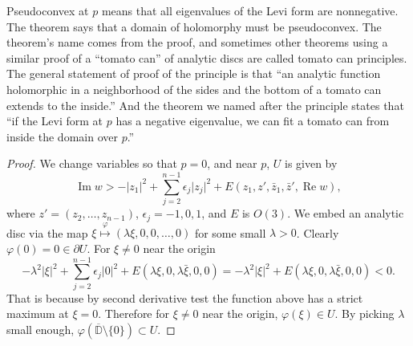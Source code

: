 \documentclass[12pt,openany]{book}
\renewcommand{\Re}{\operatorname{Re}}
\renewcommand{\Im}{\operatorname{Im}}
\newcommand{\sabs}[1]{\lvert {#1} \rvert}
\newcommand{\D}{{\mathbb{D}}}
\theoremstyle{plain}
\theoremstyle{remark}
\theoremstyle{definition}
\theoremstyle{exercise}
\theoremstyle{example}
\begin{document}
Pseudoconvex at $p$ means that all eigenvalues of the Levi form are
nonnegative.
The theorem says that a domain of holomorphy must be pseudoconvex.
The theorem's name comes from the proof, and sometimes other theorems using a
similar proof of a ``tomato can'' of analytic discs are called
tomato can principles.
The general statement of proof of the principle is that ``an
analytic function holomorphic in a neighborhood of the sides and the bottom
of a tomato can extends to the inside.''  And the theorem we named after
the principle states that ``if the Levi form at $p$ has a negative
eigenvalue, we can fit a tomato can from inside the domain over $p$.''

\begin{proof}
We change variables so that $p = 0$, and
near $p$, $U$ is given by
\begin{equation*}
\Im w > -\sabs{z_1}^2 + \sum_{j=2}^{n-1} \epsilon_j \sabs{z_j}^2 +
E(z_1,z',\bar{z}_1,\bar{z}',\Re w) ,
\end{equation*}
where $z' = (z_2,\ldots,z_{n-1})$, $\epsilon_j = -1,0,1$, and $E$ is $O(3)$.
We embed an analytic disc via the map
$\xi \overset{\varphi}{\mapsto} (\lambda \xi, 0, 0, \ldots, 0)$ for some small $\lambda > 0$.
%
Clearly $\varphi(0) = 0 \in \partial U$.  For $\xi \not= 0$ near the origin
\begin{equation*}
-\lambda^2 \sabs{\xi}^2 + \sum_{j=2}^{n-1} \epsilon_j \sabs{0}^2 + E(\lambda
\xi,0,\lambda \bar{\xi},0,0)
=
-\lambda^2 \sabs{\xi}^2 + E(\lambda
\xi,0,\lambda \bar{\xi},0,0)
< 0 .
\end{equation*}
That is because by second derivative test the function above has a strict
maximum
at $\xi = 0$.  Therefore for $\xi \not= 0$ near the origin,
$\varphi(\xi) \in U$.  By picking $\lambda$ small enough,
$\varphi(\overline{\D}\setminus\{0\}) \subset U$.


\end{proof}
\end{document}
